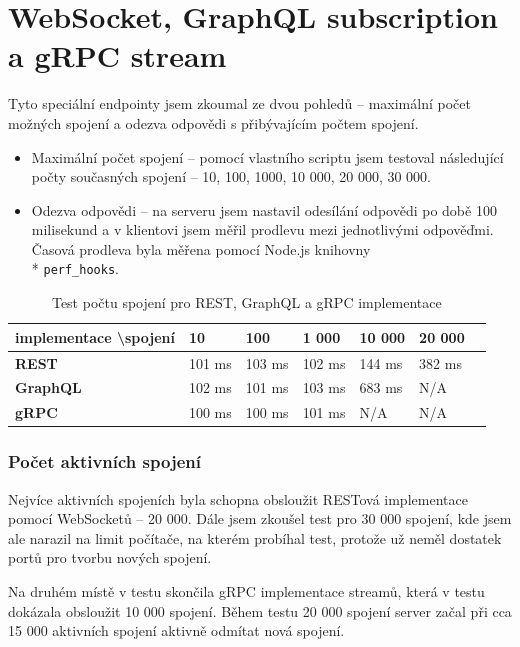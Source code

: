 \documentclass[thesis=M,czech]{FITthesis}[2019/12/23]
\begin{document}
\section{WebSocket, GraphQL subscription a gRPC stream}
Tyto speciální endpointy jsem zkoumal ze dvou pohledů -- maximální počet možných spojení a odezva odpovědi s přibývajícím počtem spojení.

\begin{itemize}
  \item Maximální počet spojení -- pomocí vlastního scriptu jsem testoval následující počty současných spojení --  10, 100, 1000, 10 000, 20 000, 30 000.
  \item Odezva odpovědi -- na serveru jsem nastavil odesílání odpovědi po době 100 milisekund a v klientovi jsem měřil prodlevu mezi jednotlivými odpověďmi. Časová prodleva byla měřena pomocí Node.js knihovny \\* \texttt{perf_hooks}.
\end{itemize}

\begin{table}[h]
  \begin{tabular}{|l|l|l|l|l|l|l|}
  \hline
  \textbf{implementace \textbackslash spojení} & \textbf{10}     & \textbf{100}    & \textbf{1 000  }& \textbf{10 000}& \textbf{20 000} \\ \hline
  \textbf{REST}                                      & 101 ms & 103 ms & 102 ms & 144 ms & 382 ms   \\ \hline
  \textbf{GraphQL}                                   & 102 ms & 101 ms & 103 ms & 683 ms & N/A      \\ \hline
  \textbf{gRPC}                                      & 100 ms & 100 ms & 101 ms & N/A    & N/A      \\ \hline
  \end{tabular}
  \caption{Test počtu spojení pro REST, GraphQL a gRPC implementace}
\end{table}

\clearpage
\subsubsection*{Počet aktivních spojení}
Nejvíce aktivních spojeních byla schopna obsloužit RESTová implementace pomocí WebSocketů -- 20 000. Dále jsem zkoušel test pro 30 000 spojení, kde jsem ale narazil na limit počítače, na kterém probíhal test, protože už neměl dostatek portů pro tvorbu nových spojení.

Na druhém místě v testu skončila gRPC implementace streamů, která v testu dokázala obsloužit 10 000 spojení. Během testu 20 000 spojení server začal při cca 15 000 aktivních spojení aktivně odmítat nová spojení.
\end{document}
